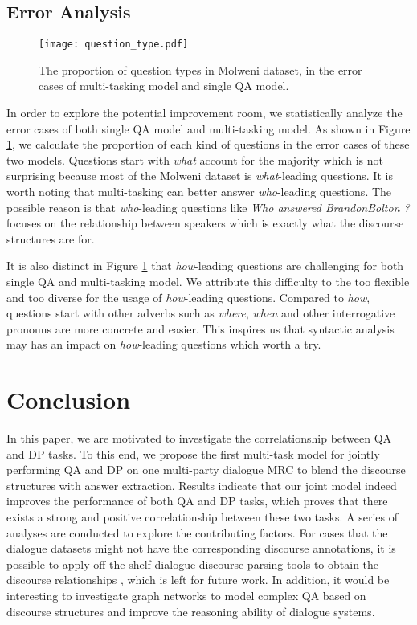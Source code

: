\documentclass[11pt]{article}
\begin{document}
\subsection{Error Analysis}\label{subsubsec:error analysis}
\begin{figure}[ht]
		\centering
		\texttt{[image: question\_type.pdf]}
		\caption{\label{fig:question proportion}The proportion of question types in Molweni dataset, in the error cases of multi-tasking model and single QA model.}
\end{figure}
In order to explore the potential improvement room, we statistically analyze the error cases of both single QA model and multi-tasking model. As shown in Figure \ref{fig:question proportion}, we calculate the proportion of each kind of questions in the error cases of these two models. Questions start with \textit{what} account for the majority which is not surprising because most of the Molweni dataset is \textit{what}-leading questions. It is worth noting that multi-tasking can better answer \textit{who}-leading questions. The possible reason is that \textit{who}-leading questions like \textit{Who answered BrandonBolton ?} focuses on the relationship between speakers which is exactly what the discourse structures are for.

It is also distinct in Figure \ref{fig:question proportion} that \textit{how}-leading questions are challenging for both single QA and multi-tasking model. We attribute this difficulty to the too flexible and too diverse for the usage of \textit{how}-leading questions. Compared to \textit{how}, questions start with other adverbs such as \textit{where}, \textit{when} and other interrogative pronouns are more concrete and easier. This inspires us that syntactic analysis may has an impact on \textit{how}-leading questions which worth a try.

\section{Conclusion}\label{sec:conclusion}
In this paper, we are motivated to investigate the correlationship between QA and DP tasks. To this end, we propose the first multi-task model for jointly performing QA and DP on one multi-party dialogue MRC to blend the discourse structures with answer extraction. Results indicate that our joint model indeed improves the performance of both QA and DP tasks, which proves that there exists a strong and positive correlationship between these two tasks. A series of analyses are conducted to explore the contributing factors. For cases that the dialogue datasets might not have the corresponding discourse annotations, it is possible to apply off-the-shelf dialogue discourse parsing tools to obtain the discourse relationships  \cite{ouyang2020dialogue}, which is left for future work. In addition, it would be interesting to investigate graph networks to model complex QA based on discourse structures and improve the reasoning ability of dialogue systems.
\end{document}
